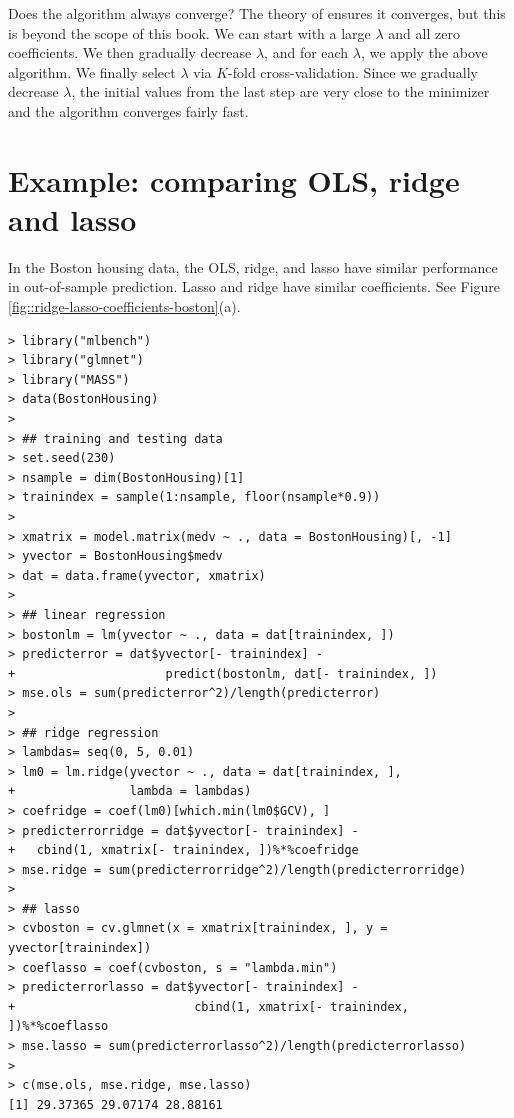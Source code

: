 Does the algorithm always converge? 
The theory of \citet{tseng2001convergence} ensures it converges, but this is beyond the scope of this book. 
We can start with a large $\lambda$ and all zero coefficients. We then
gradually decrease $\lambda$, and for each $\lambda$, we apply the
above algorithm. We finally select $\lambda$ via $K$-fold cross-validation. Since we gradually decrease $\lambda$, the initial values from the last step are very close to the minimizer and the algorithm converges fairly fast. 


\section{Example: comparing OLS, ridge and lasso}\label{sec::lasso-example}

In the Boston housing data, the OLS, ridge, and lasso have similar performance in out-of-sample prediction. Lasso and ridge have similar coefficients. See Figure \ref{fig::ridge-lasso-coefficients-boston}(a). 

\begin{lstlisting}
> library("mlbench")
> library("glmnet")
> library("MASS")
> data(BostonHousing)
> 
> ## training and testing data
> set.seed(230)
> nsample = dim(BostonHousing)[1]
> trainindex = sample(1:nsample, floor(nsample*0.9))
> 
> xmatrix = model.matrix(medv ~ ., data = BostonHousing)[, -1]
> yvector = BostonHousing$medv 
> dat = data.frame(yvector, xmatrix)
> 
> ## linear regression
> bostonlm = lm(yvector ~ ., data = dat[trainindex, ])
> predicterror = dat$yvector[- trainindex] - 
+                     predict(bostonlm, dat[- trainindex, ])
> mse.ols = sum(predicterror^2)/length(predicterror)
> 
> ## ridge regression 
> lambdas= seq(0, 5, 0.01)
> lm0 = lm.ridge(yvector ~ ., data = dat[trainindex, ],
+                lambda = lambdas)
> coefridge = coef(lm0)[which.min(lm0$GCV), ]
> predicterrorridge = dat$yvector[- trainindex] -
+   cbind(1, xmatrix[- trainindex, ])%*%coefridge
> mse.ridge = sum(predicterrorridge^2)/length(predicterrorridge)
> 
> ## lasso 
> cvboston = cv.glmnet(x = xmatrix[trainindex, ], y = yvector[trainindex])
> coeflasso = coef(cvboston, s = "lambda.min")
> predicterrorlasso = dat$yvector[- trainindex] -
+                         cbind(1, xmatrix[- trainindex, ])%*%coeflasso
> mse.lasso = sum(predicterrorlasso^2)/length(predicterrorlasso)
> 
> c(mse.ols, mse.ridge, mse.lasso)
[1] 29.37365 29.07174 28.88161
\end{lstlisting}

